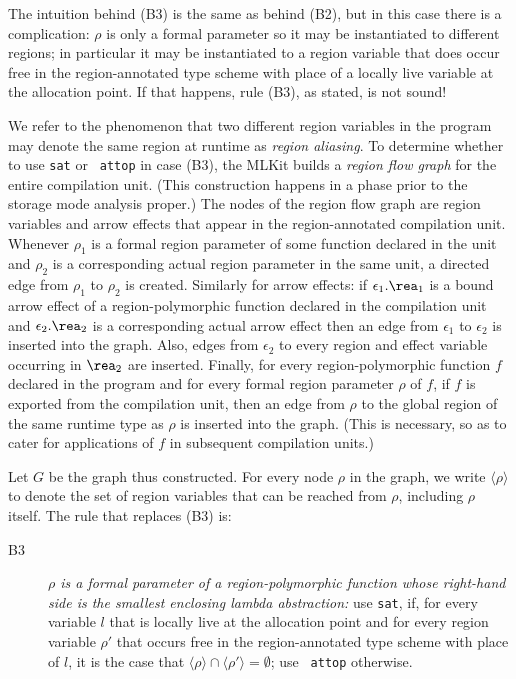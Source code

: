 \documentclass[12pt]{book}
\begin{document}
The intuition behind (B3) is the same as behind (B2), but in this case
there is a complication: $\rho$ is only a formal parameter so it may
be instantiated to different regions; in particular it may be
instantiated to a region variable that does occur free in the
region-annotated type scheme with place of a locally live variable at
the allocation point. If that happens, rule (B3), as stated, is not
sound!

We refer to the phenomenon that two different region variables in the
program may denote the same region at runtime as
%
{\em region aliasing}. To determine whether to use {\tt sat} or {\tt
  attop} in case (B3), the MLKit builds a
%
\label{region flow graph}%
{\em region flow graph\/} for the entire compilation unit. (This
construction happens in a phase prior to the storage mode analysis
proper.)  The nodes of the region flow graph are region variables and
arrow effects that appear in the region-annotated compilation unit.
Whenever $\rho_1$ is a formal region parameter of some function
declared in the unit and $\rho_2$ is a corresponding actual region
parameter in the same unit, a directed edge from $\rho_1$ to $\rho_2$
is created. Similarly for arrow effects: if $\epsilon_1.\rea_1$ is a
bound arrow effect of a region-polymorphic function declared in the
compilation unit and $\epsilon_2.\rea_2$ is a corresponding actual
arrow effect then an edge from $\epsilon_1$ to $\epsilon_2$ is
inserted into the graph.  Also, edges from $\epsilon_2$ to every
region and effect variable occurring in $\rea_2$ are inserted.
Finally, for every region-polymorphic function $f$ declared in the
program and for every formal region parameter $\rho$ of $f$, if $f$ is
exported from the compilation unit, then an edge from $\rho$ to the
global region of the same runtime type as $\rho$ is inserted into the
graph. (This is necessary, so as to cater for applications of $f$ in
subsequent compilation units.)

Let $G$ be the graph thus constructed.  For every node $\rho$ in the
graph, we write $\langle\rho\rangle$ to denote the set of region
variables that can be reached from $\rho$, including $\rho$ itself.
The rule that replaces (B3) is:
%
\begin{description}
\item[B3]{\it $\rho$ is a formal parameter of a region-polymorphic
    function whose right-hand side is the smallest enclosing lambda
    abstraction:} use {\tt sat}, if, for every variable $l$ that is
  locally live at the allocation point and for every region variable
  $\rho'$ that occurs free in the region-annotated type scheme with
  place of $l$, it is the case that
  $\langle\rho\rangle\cap\langle\rho'\rangle =\emptyset$; use {\tt
    attop} otherwise.
\end{description}
\medskip
\end{document}
